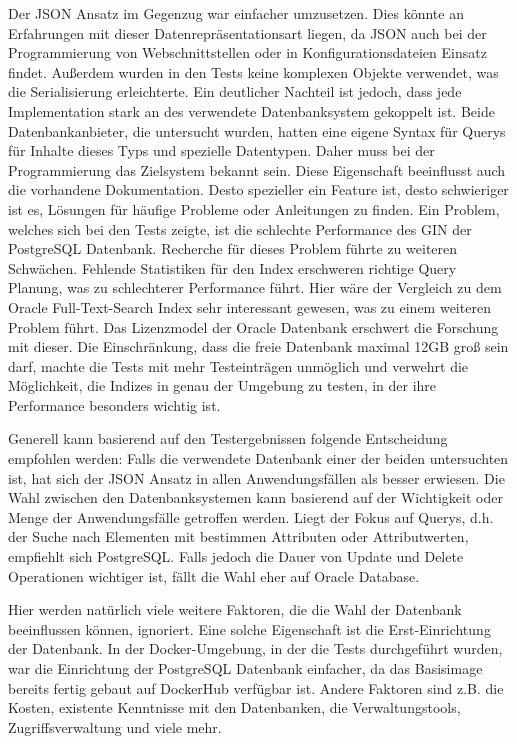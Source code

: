 Der JSON Ansatz im Gegenzug war einfacher umzusetzen. Dies könnte an Erfahrungen mit dieser Datenrepräsentationsart liegen, da JSON auch bei der Programmierung von Webschnittstellen oder in Konfigurationsdateien Einsatz findet. Außerdem wurden in den Tests keine komplexen Objekte verwendet, was die Serialisierung erleichterte. Ein deutlicher Nachteil ist jedoch, dass jede Implementation stark an des verwendete Datenbanksystem gekoppelt ist. Beide Datenbankanbieter, die untersucht wurden, hatten eine eigene Syntax für Querys für Inhalte dieses Typs und spezielle Datentypen. Daher muss bei der Programmierung das Zielsystem bekannt sein. Diese Eigenschaft beeinflusst auch die vorhandene Dokumentation. Desto spezieller ein Feature ist, desto schwieriger ist es, Lösungen für häufige Probleme oder Anleitungen zu finden.
Ein Problem, welches sich bei den Tests zeigte, ist die schlechte Performance des \ac{GIN} der PostgreSQL Datenbank. Recherche für dieses Problem führte zu weiteren Schwächen. Fehlende Statistiken für den Index erschweren richtige Query Planung, was zu schlechterer Performance führt. Hier wäre der Vergleich zu dem Oracle Full-Text-Search Index sehr interessant gewesen, was zu einem weiteren Problem führt.
Das Lizenzmodel der Oracle Datenbank erschwert die Forschung mit dieser. Die Einschränkung, dass die freie Datenbank maximal 12GB groß sein darf, machte die Tests mit mehr Testeinträgen unmöglich und verwehrt die Möglichkeit, die Indizes in genau der Umgebung zu testen, in der ihre Performance besonders wichtig ist.



Generell kann basierend auf den Testergebnissen folgende Entscheidung empfohlen werden:
Falls die verwendete Datenbank einer der beiden untersuchten ist, hat sich der JSON Ansatz in allen Anwendungsfällen als besser erwiesen. Die Wahl zwischen den Datenbanksystemen kann basierend auf der Wichtigkeit oder Menge der Anwendungsfälle getroffen werden. Liegt der Fokus auf Querys, d.h. der Suche nach Elementen mit bestimmen Attributen oder Attributwerten, empfiehlt sich PostgreSQL. Falls jedoch die Dauer von Update und Delete Operationen wichtiger ist, fällt die Wahl eher auf Oracle Database.

Hier werden natürlich viele weitere Faktoren, die die Wahl der Datenbank beeinflussen können, ignoriert. Eine solche Eigenschaft ist die Erst-Einrichtung der Datenbank. In der Docker-Umgebung, in der die Tests durchgeführt wurden, war die Einrichtung der PostgreSQL Datenbank einfacher, da das Basisimage bereits fertig gebaut auf DockerHub verfügbar ist. Andere Faktoren sind z.B. die Kosten, existente Kenntnisse mit den Datenbanken, die Verwaltungstools, Zugriffsverwaltung und viele mehr.

